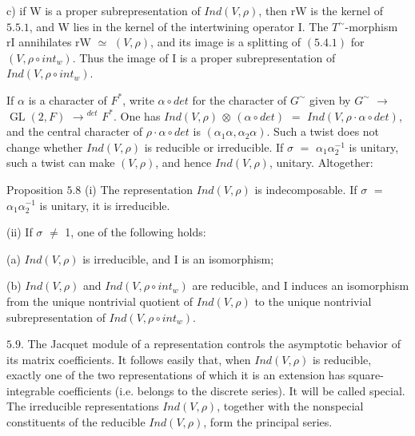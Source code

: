 \documentclass[10pt,a4paper]{article}
\begin{document}
\clearpage
{}
\label{d035-physical-024}
\par c) if W is a proper subrepresentation of $Ind(V,\rho{})$, then rW is the kernel of $5.5.1$, and W lies in the kernel of the intertwining operator I. The $T^\sim$-morphism rI annihilates rW $\simeq{}$ $(V,\rho{})$, and its image is a splitting of $(5.4.1)$ for $(V,\rho{}∘int_w)$. Thus the image of I is a proper subrepresentation of $Ind(V,\rho{}∘int_w)$.\par
\par If $\alpha{}$ is a character of $F^*$, write $\alpha{}∘det$ for the character of $G^\sim$ given by $G^\sim$ $\to{}$ $\operatorname{GL}(2,F)$ $\to{}^{det}$ $F^*$. One has $Ind(V,\rho{})$ $\otimes{}$ $(\alpha{}∘det)$ $=$ $Ind(V,\rho{}\cdot{}\alpha{}∘det)$, and the central character of $\rho{}\cdot{}\alpha{}∘det$ is $(\alpha{}_1\alpha{},\alpha{}_2\alpha{})$. Such a twist does not change whether $Ind(V,\rho{})$ is reducible or irreducible. If $\sigma{}$ $=$ $\alpha{}_1\alpha{}_2^{-1}$ is unitary, such a twist can make $(V,\rho{})$, and hence $Ind(V,\rho{})$, unitary. Altogether:\par
\par Proposition $5.8$ (i) The representation $Ind(V,\rho{})$ is indecomposable. If $\sigma{}$ $=$ $\alpha{}_1\alpha{}_2^{-1}$ is unitary, it is irreducible.\par
\par (ii) If $\sigma{}$ $\ne{}$ 1, one of the following holds:\par
\par (a) $Ind(V,\rho{})$ is irreducible, and I is an isomorphism;\par
\par (b) $Ind(V,\rho{})$ and $Ind(V,\rho{}∘int_w)$ are reducible, and I induces an isomorphism from the unique nontrivial quotient of $Ind(V,\rho{})$ to the unique nontrivial subrepresentation of $Ind(V,\rho{}∘int_w)$.\par
\par $5.9$. The Jacquet module of a representation controls the asymptotic behavior of its matrix coefficients. It follows easily that, when $Ind(V,\rho{})$ is reducible, exactly one of the two representations of which it is an extension has square-integrable coefficients (i.e. belongs to the discrete series). It will be called special. The irreducible representations $Ind(V,\rho{})$, together with the nonspecial constituents of the reducible $Ind(V,\rho{})$, form the principal series.\par
\end{document}
